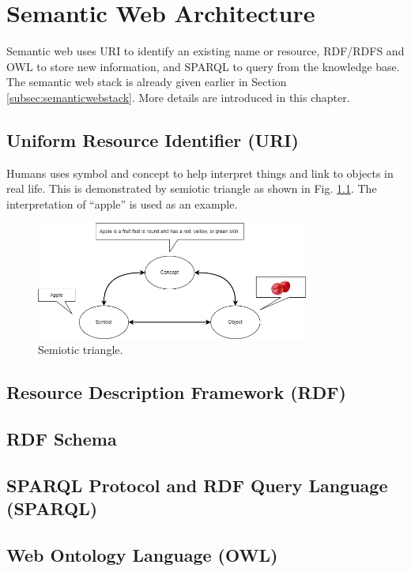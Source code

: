 \chapter{Semantic Web Architecture}

Semantic web uses URI to identify an existing name or resource, RDF/RDFS and OWL to store new information, and SPARQL to query from the knowledge base. The semantic web stack is already given earlier in Section \ref{subsec:semanticwebstack}. More details are introduced in this chapter.

\section{Uniform Resource Identifier (URI)}

Humans uses symbol and concept to help interpret things and link to objects in real life. This is demonstrated by semiotic triangle as shown in Fig. \ref{fig:semiotictriangle}. The interpretation of ``apple'' is used as an example.

\begin{figure}[htbp]
	\centering
	\includegraphics[width=0.8\textwidth]{./chapters/ch-semanticwebarchitecture/figures/semiotic_triangle.png}
	\caption{Semiotic triangle.}
	\label{fig:semiotictriangle}
\end{figure} 



\section{Resource Description Framework (RDF)}

\section{RDF Schema}

\section{SPARQL Protocol and RDF Query Language (SPARQL)}

\section{Web Ontology Language (OWL)}
